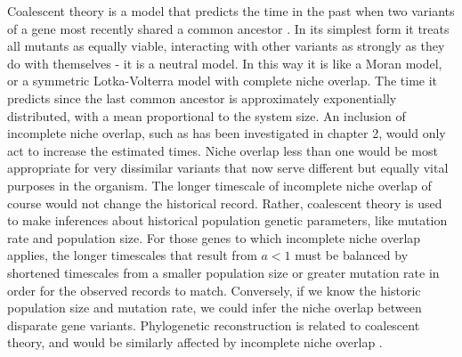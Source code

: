 Coalescent theory is a model that predicts the time in the past when two variants of a gene most recently shared a common ancestor \cite{Kingman1982,Rouzine2001,Blythe2007,Rogers2014}. 
In its simplest form it treats all mutants as equally viable, interacting with other variants as strongly as they do with themselves \cite{Ricklefs2006,Rosindell2011} - it is a neutral model. %
In this way it is like a Moran model, or a symmetric Lotka-Volterra model with complete niche overlap. 
The time it predicts since the last common ancestor is approximately exponentially distributed, with a mean proportional to the system size. %
An inclusion of incomplete niche overlap, such as has been investigated in chapter 2, would only act to increase the estimated times. 
Niche overlap less than one would be most appropriate for very dissimilar variants that now serve different but equally vital purposes in the organism. 
The longer timescale of incomplete niche overlap of course would not change the historical record. 
Rather, coalescent theory is used to make inferences about historical population genetic parameters, like mutation rate and population size. 
For those genes to which incomplete niche overlap applies, the longer timescales that result from $a<1$ must be balanced by shortened timescales from a smaller population size or greater mutation rate in order for the observed records to match. 
Conversely, if we know the historic population size and mutation rate, we could infer the niche overlap between disparate gene variants. 
Phylogenetic reconstruction is related to coalescent theory, and would be similarly affected by incomplete niche overlap \cite{Ricklefs2006}. %


